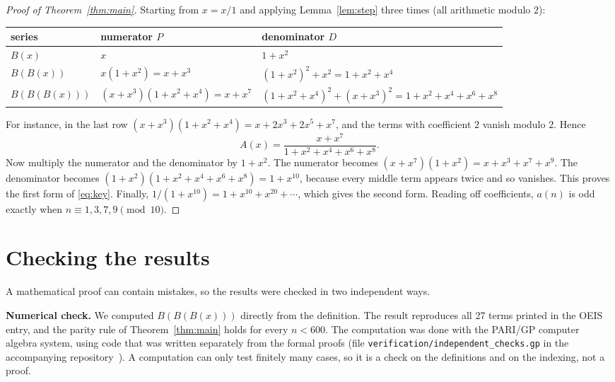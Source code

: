 \documentclass[11pt,a4paper]{article}
\theoremstyle{definition}
\theoremstyle{remark}
\newcommand{\para}[1]{\par\medskip\noindent\textbf{#1}\enspace}
\begin{document}
\begin{proof}[Proof of Theorem~\ref{thm:main}]
Starting from $x=x/1$ and applying Lemma~\ref{lem:step} three times (all arithmetic modulo $2$):
\begin{center}\small\setlength{\tabcolsep}{4pt}\renewcommand{\arraystretch}{1.2}
\begin{tabular}{lll}
\toprule
series & numerator $P$ & denominator $D$\\
\midrule
$B(x)$ & $x$ & $1+x^2$\\
$B(B(x))$ & $x(1+x^2)=x+x^3$ & $(1+x^2)^2+x^2=1+x^2+x^4$\\
$B(B(B(x)))$ & $(x+x^3)(1+x^2+x^4)=x+x^7$ & $(1+x^2+x^4)^2+(x+x^3)^2=1+x^2+x^4+x^6+x^8$\\
\bottomrule
\end{tabular}
\end{center}
For instance, in the last row $(x+x^3)(1+x^2+x^4)=x+2x^3+2x^5+x^7$, and the terms with coefficient $2$ vanish
modulo $2$. Hence
\[
A(x)=\frac{x+x^7}{1+x^2+x^4+x^6+x^8}.
\]
Now multiply the numerator and the denominator by $1+x^2$. The numerator becomes $(x+x^7)(1+x^2)=x+x^3+x^7+x^9$. The
denominator becomes $(1+x^2)(1+x^2+x^4+x^6+x^8)=1+x^{10}$, because every middle term appears twice and so vanishes.
This proves the first form of \eqref{eq:key}. Finally, $1/(1+x^{10})=1+x^{10}+x^{20}+\cdots$, which
gives the second form. Reading off coefficients, $a(n)$ is odd exactly when $n\equiv1,3,7,9\pmod{10}$.
\end{proof}

\section{Checking the results}\label{sec:checks}

A mathematical proof can contain mistakes, so the results were checked in two independent ways.

\para{Numerical check.}
We computed $B(B(B(x)))$ directly from the definition. The result reproduces all 27 terms printed in the OEIS
entry, and the parity rule of Theorem~\ref{thm:main} holds for every $n<600$.
The computation was done with the PARI/GP computer algebra system, using code that was written separately from the
formal proofs (file \texttt{verification/independent\_checks.gp} in the accompanying repository~\cite{repo}).
A computation can only test finitely many cases, so it is a check on the definitions and on the indexing, not a proof.
\end{document}
